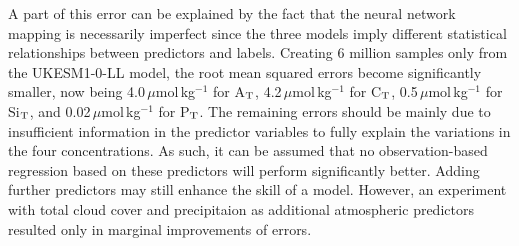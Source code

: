 \documentclass{article}
\begin{document}
	A part of this error can be explained by the fact that the neural network mapping is necessarily imperfect since the three models imply different statistical relationships between predictors and labels. Creating 6 million samples only from the UKESM1-0-LL model, the root mean squared errors become significantly smaller, now being 4.0\,$\mu$mol\,kg$^{-1}$ for A$_\textup{T}$, 4.2\,$\mu$mol\,kg$^{-1}$ for C$_\textup{T}$, 0.5\,$\mu$mol\,kg$^{-1}$ for Si$_\textup{T}$, and 0.02\,$\mu$mol\,kg$^{-1}$ for P$_\textup{T}$. The remaining errors should be mainly due to insufficient information in the predictor variables to fully explain the variations in the four concentrations. As such, it can be assumed that no observation-based regression based on these predictors will perform significantly better. Adding further predictors may still enhance the skill of a model. However, an experiment with total cloud cover and precipitaion as additional atmospheric predictors resulted only in marginal improvements of errors. 
	
	
\end{document}

